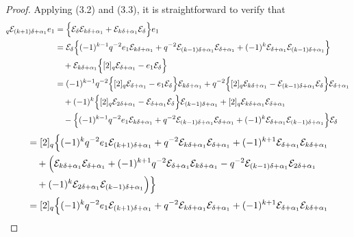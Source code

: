 \documentclass[10pt,a4paper]{amsart}
\begin{document}
\begin{proof}
Applying (3.2) and (3.3), it is straightforward to verify that
\begin{align*}
[2]_q\mathcal{E}_{(k+1)\delta+\alpha_{1}}e_{1} &=\Bigl\{\mathcal{E}_{\delta}\mathcal{E}_{k\delta+\alpha_{1}} + \mathcal{E}_{k\delta+\alpha_{1}}\mathcal{E}_{\delta}\Bigr\}e_{1}\\
&=\mathcal{E}_{\delta}\Bigl\{(-1)^{k-1} q^{-2}e_1\mathcal{E}_{k\delta+\alpha_{1}}+q^{-2}\mathcal{E}_{(k-1)\delta+\alpha_{1}}\mathcal{E}_{\delta+\alpha_{1}}+(-1)^k\mathcal{E}_{\delta+\alpha_{1}}\mathcal{E}_{(k-1)\delta+\alpha_{1}}\Bigr\}\\
&\quad+\mathcal{E}_{k\delta+\alpha_{1}}\Bigl\{[2]_q\mathcal{E}_{\delta+\alpha_{1}} -e_1\mathcal{E}_{\delta}\Bigr\}\\
&=(-1)^{k-1} q^{-2}\Bigl\{[2]_q\mathcal{E}_{\delta+\alpha_{1}} -e_1\mathcal{E}_{\delta}\Bigr\}\mathcal{E}_{k\delta+\alpha_{1}}+q^{-2}\Bigl\{ [2]_q\mathcal{E}_{k\delta+\alpha_{1}}-\mathcal{E}_{(k-1)\delta+\alpha_{1}}\mathcal{E}_{\delta}\Bigr\}\mathcal{E}_{\delta+\alpha_{1}}
\\
&\quad+(-1)^k\Bigl\{[2]_q\mathcal{E}_{2\delta+\alpha_{1}}-\mathcal{E}_{\delta+\alpha_{1}}\mathcal{E}_{\delta}\Bigr\}\mathcal{E}_{(k-1)\delta+\alpha_{1}}+[2]_q\mathcal{E}_{k\delta+\alpha_{1}} \mathcal{E}_{\delta+\alpha_{1}}
\\
&\quad-\Bigl\{(-1)^{k-1} q^{-2}e_1\mathcal{E}_{k\delta+\alpha_{1}}+q^{-2}\mathcal{E}_{(k-1)\delta+\alpha_{1}}\mathcal{E}_{\delta+\alpha_{1}}+(-1)^k\mathcal{E}_{\delta+\alpha_{1}}\mathcal{E}_{(k-1)\delta+\alpha_{1}}\Bigr\}\mathcal{E}_{\delta}
\end{align*}
\begin{align*}
&=[2]_q\Bigl\{(-1)^{k}q^{-2}e_{1}\mathcal{E}_{(k+1)\delta+\alpha_{1}}+q^{-2}\mathcal{E}_{k\delta+\alpha_{1}}\mathcal{E}_{\delta+\alpha_{1}}+(-1)^{k+1}\mathcal{E}_{\delta+\alpha_{1}}\mathcal{E}_{k\delta+\alpha_{1}}\\
&\quad+\Bigl(\mathcal{E}_{k\delta+\alpha_{1}}\mathcal{E}_{\delta+\alpha_1}+(-1)^{k+1}q^{-2}\mathcal{E}_{\delta+\alpha_1}\mathcal{E}_{k\delta+\alpha_{1}}-q^{-2}\mathcal{E}_{(k-1)\delta+\alpha_{1}}\mathcal{E}_{2\delta+\alpha_{1}}\\
&\quad+(-1)^{k}\mathcal{E}_{2\delta+\alpha_{1}}\mathcal{E}_{(k-1)\delta+\alpha_{1}}\Bigr)\Bigr\}\\
&=[2]_q\Bigl\{(-1)^{k}q^{-2}e_{1}\mathcal{E}_{(k+1)\delta+\alpha_{1}}+q^{-2}\mathcal{E}_{k\delta+\alpha_{1}}\mathcal{E}_{\delta+\alpha_{1}}+(-1)^{k+1}\mathcal{E}_{\delta+\alpha_{1}}\mathcal{E}_{k\delta+\alpha_{1}}\\

\end{align*}
\end{proof}
\end{document}
